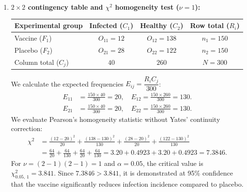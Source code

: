 \begin{solproblema}
	\begin{enumerate}
		\item \textbf{$2 \times 2$ contingency table and $\chi^2$ homogeneity test ($\nu = 1$):}
		\begin{center}
			\begin{tabular}{|l|c|c|c|}\hline
				Experimental group & Infected ($C_1$) & Healthy ($C_2$) & Row total ($R_i$) \\\hline
				Vaccine ($F_1$) & $O_{11} = 12$ & $O_{12} = 138$ & $n_1 = 150$ \\\hline
				Placebo ($F_2$) & $O_{21} = 28$ & $O_{22} = 122$ & $n_2 = 150$ \\\hline
				Column total ($C_j$) & $40$ & $260$ & $N = 300$ \\\hline
			\end{tabular}
		\end{center}
		We calculate the expected frequencies $E_{ij} = \dfrac{R_i C_j}{300}$:
		\begin{align}
			E_{11} &= \frac{150 \times 40}{300} = 20, \quad E_{12} = \frac{150 \times 260}{300} = 130. \\
			E_{21} &= \frac{150 \times 40}{300} = 20, \quad E_{22} = \frac{150 \times 260}{300} = 130.
		\end{align}
		We evaluate Pearson's homogeneity statistic without Yates' continuity correction:
		\begin{align}
			\chi^2 &= \frac{(12-20)^2}{20} + \frac{(138-130)^2}{130} + \frac{(28-20)^2}{20} + \frac{(122-130)^2}{130} \\
			&= \frac{64}{20} + \frac{64}{130} + \frac{64}{20} + \frac{64}{130} = 3.20 + 0.4923 + 3.20 + 0.4923 = 7.3846.
		\end{align}
		For $\nu = (2-1)(2-1) = 1$ and $\alpha = 0.05$, the critical value is $\chi^2_{0.05, \, 1} = 3.841$.
		Since $7.3846 > 3.841$, it is demonstrated at 95\% confidence that the vaccine significantly reduces infection incidence compared to placebo.
		

\end{enumerate}
\end{solproblema}
